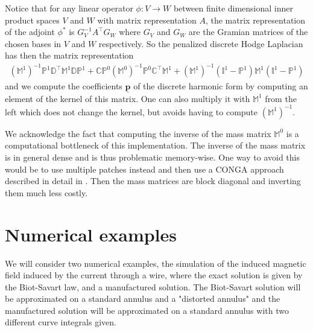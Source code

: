 \documentclass[../master_thesis.tex]{subfiles}
\begin{document}
Notice that for any linear operator $\phi:V \rightarrow W$ between finite dimensional inner product spaces 
$V$ and $W$ with matrix representation $A$, the matrix representation of the
adjoint $\phi^*$ is $G_V^{-1} A^\top G_W$ where 
$G_V$ and $G_W$ are the Gramian matrices of the chosen bases in $V$ and $W$ 
respectively. So the penalized discrete Hodge Laplacian has then the matrix 
representation \begin{align*}
    (\mathbb{M}^1)^{-1} \mathbb{P}^1\mathbb{D}^\top \mathbb{M}^1 \mathbb{D}\mathbb{P}^1 
    + \mathbb{C} \mathbb{P}^0 (\mathbb{M}^0)^{-1} \mathbb{P}^0 \mathbb{C}^\top \mathbb{M}^1
    + (\mathbb{M}^1)^{-1} (\mathbb{I}^1-\mathbb{P}^1) \mathbb{M}^1 (\mathbb{I}^1 - \mathbb{P}^1)
\end{align*} and we compute the 
coefficients $\underline{\mathbf{p}}$ of the discrete harmonic form
by computing an element of the kernel of this matrix. One can also multiply it with 
$\mathbb{M}^1$ from the left which does not change the kernel, but avoids having to 
compute $(\mathbb{M}^1)^{-1}$. 
\begin{remark}
    We acknowledge the fact that computing the inverse of the mass matrix $\mathbb{M}^0$
    is a computational bottleneck of this implementation. The inverse of the mass matrix 
    is in general dense and is thus
    problematic memory-wise. 
    One way to avoid this would be to use multiple patches instead and then use a 
    CONGA approach described in detail in \cite{multipatch_paper}. Then the mass matrices 
    are block diagonal and inverting them much less costly.
\end{remark}


\section{Numerical examples}
We will consider two numerical examples, the simulation of the induced magnetic 
field induced by the current through a wire, where the exact solution is given by the Biot-Savart law, and 
a manufactured solution. The Biot-Savart solution will be approximated on a standard annulus 
and a "distorted annulus" and the manufactured solution will be approximated 
on a standard annulus with two different curve integrals given.
\end{document}

